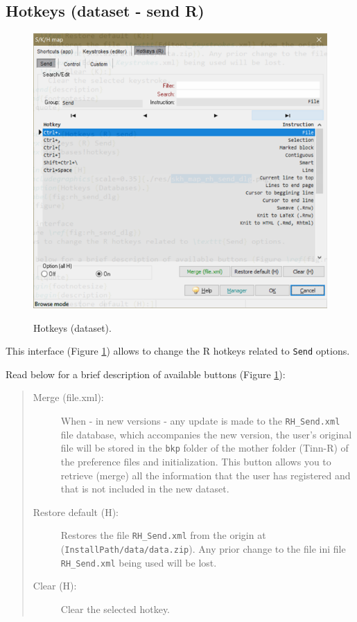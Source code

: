 \subsection{Hotkeys (dataset - send R)}

\begin{figure}[H]
  \includegraphics[scale=0.8]{./res/dlg_skh_map_rh_send.png}\\
  \caption{Hotkeys (dataset).}
  \label{fig:rh_send_dlg}
\end{figure}

This interface
(Figure \ref{fig:rh_send_dlg})
allows to change the R hotkeys related to \texttt{Send} options.

Read below for a brief description of available buttons (Figure \ref{fig:rh_send_dlg}):

\begin{quote}
  \begin{footnotesize}
    \begin{description}
      \item[Merge (file.xml):]
        When - in new versions - any update is made to the \texttt{RH\_Send.xml} file database,
        which accompanies the new version, the user's original file will be stored in
        the \texttt{bkp} folder of the mother folder (Tinn-R) of the preference files and initialization.
        This button allows you to retrieve (merge) all the information that the user has registered
        and that is not included in the new dataset.
      \item[Restore default (H):]
        Restores the file \texttt{RH\_Send.xml} from the origin at
        (\texttt{InstallPath/data/data.zip}). Any prior change to the file ini file
        \texttt{RH\_Send.xml} being used will be lost.
      \item[Clear (H):]
        Clear the selected hotkey.
    \end{description}
  \end{footnotesize}
\end{quote}


